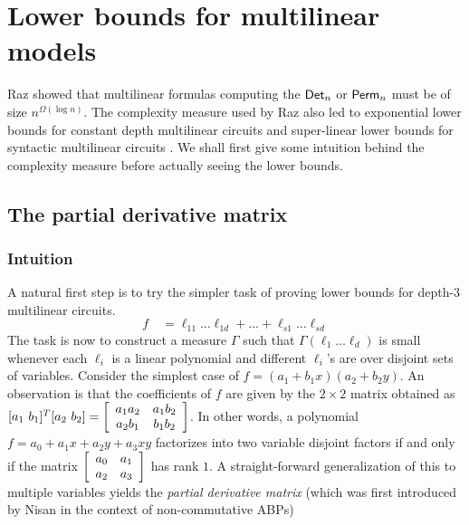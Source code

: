 \chapter{Lower bounds for multilinear models}\label{chap:multilinear}



Raz \cite{raz2004} showed that multilinear formulas computing the $\mathsf{Det}_n$ or $\mathsf{Perm}_n$ must be of size $n^{\Omega(\log n)}$. The complexity measure used by Raz also led to exponential lower bounds for constant depth multilinear circuits \cite{raz-yehudayoff} and super-linear lower bounds for syntactic multilinear circuits \cite{RSY08}. We shall first give some intuition behind the complexity measure before actually seeing the lower bounds. 

\section{The partial derivative matrix}
\subsection*{Intuition}

A natural first step is to try the simpler task of proving lower bounds for depth-$3$ multilinear circuits. 
$$
f \quad = \ell_{11} \dots \ell_{1d} + \dots + \ell_{s1}\dots \ell_{sd}
$$
The task is now to construct a measure $\Gamma$ such that $\Gamma(\ell_1\dots \ell_d)$ is small whenever each $\ell_i$ is a linear polynomial and different $\ell_i$'s are over disjoint sets of variables. Consider the simplest case of $f = (a_1  + b_1x)(a_2  + b_2y)$. An observation is that the coefficients of $f$ are given by the $2\times 2$ matrix obtained as $[a_1\ b_1]^T [a_2\ b_2] = \left[\begin{array}{cc} a_1a_2 & a_1b_2\\ a_2 b_1 & b_1 b_2\end{array}\right]$. In other words, a polynomial $f = a_0 + a_1x + a_2y + a_3xy$ factorizes into two variable disjoint factors if and only if the matrix $\left[\begin{array}{cc} a_0 & a_1\\ a_2 & a_3\end{array}\right]$ has rank $1$. A straight-forward generalization of this to multiple variables yields the \emph{partial derivative matrix} (which was first introduced by Nisan \cite{nis91} in the context of non-commutative ABPs)\\

